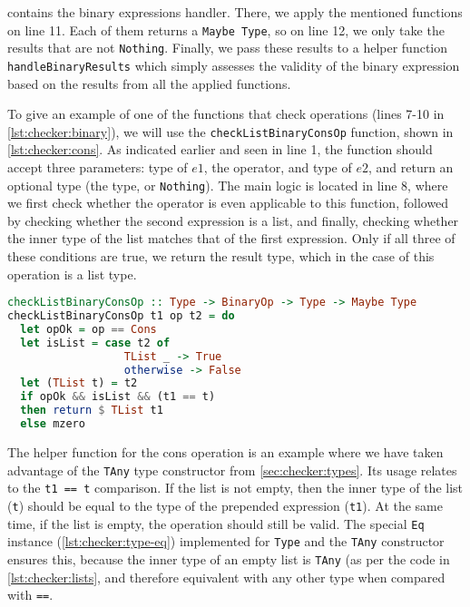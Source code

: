 \par {} contains the binary expressions handler. There, we apply the mentioned functions on line 11. Each of them returns a \lstinline{Maybe Type}, so on line 12, we only take the results that are not \lstinline{Nothing}. Finally, we pass these results to a helper function \lstinline{handleBinaryResults} which simply assesses the validity of the binary expression based on the results from all the applied functions.

\par To give an example of one of the functions that check operations (lines 7-10 in \cref{lst:checker:binary}), we will use the \lstinline{checkListBinaryConsOp} function, shown in \cref{lst:checker:cons}. As indicated earlier and seen in line 1, the function should accept three parameters: type of $e1$, the operator, and type of $e2$, and return an optional type (the type, or \lstinline{Nothing}). The main logic is located in line 8, where we first check whether the operator is even applicable to this function, followed by checking whether the second expression is a list, and finally, checking whether the inner type of the list matches that of the first expression. Only if all three of these conditions are true, we return the result type, which in the case of this operation is a list type.

\begin{lstlisting}[language=haskell,
caption={Handler for binary expressions},
label=lst:checker:cons]
checkListBinaryConsOp :: Type -> BinaryOp -> Type -> Maybe Type
checkListBinaryConsOp t1 op t2 = do
  let opOk = op == Cons
  let isList = case t2 of
                  TList _ -> True
                  otherwise -> False
  let (TList t) = t2
  if opOk && isList && (t1 == t)
  then return $ TList t1
  else mzero
\end{lstlisting}

\par The helper function for the cons operation is an example where we have taken advantage of the \lstinline{TAny} type constructor from \cref{sec:checker:types}. Its usage relates to the \lstinline{t1 == t} comparison. If the list is not empty, then the inner type of the list (\lstinline{t}) should be equal to the type of the prepended expression (\lstinline{t1}). At the same time, if the list is empty, the operation should still be valid. The special \lstinline{Eq} instance (\cref{lst:checker:type-eq}) implemented for \lstinline{Type} and the \lstinline{TAny} constructor ensures this, because the inner type of an empty list is \lstinline{TAny} (as per the code in \cref{lst:checker:lists}, and therefore equivalent with any other type when compared with \lstinline{==}.

